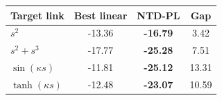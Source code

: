 \begin{tabular}{@{}lccc@{}}
\toprule
Target link & Best linear & NTD-PL & Gap \\
\midrule
\(s^2\) & -13.36 & \textbf{-16.79} & 3.42 \\
\(s^2+s^3\) & -17.77 & \textbf{-25.28} & 7.51 \\
\(\sin(\kappa s)\) & -11.81 & \textbf{-25.12} & 13.31 \\
\(\tanh(\kappa s)\) & -12.48 & \textbf{-23.07} & 10.59 \\
\bottomrule
\end{tabular}
